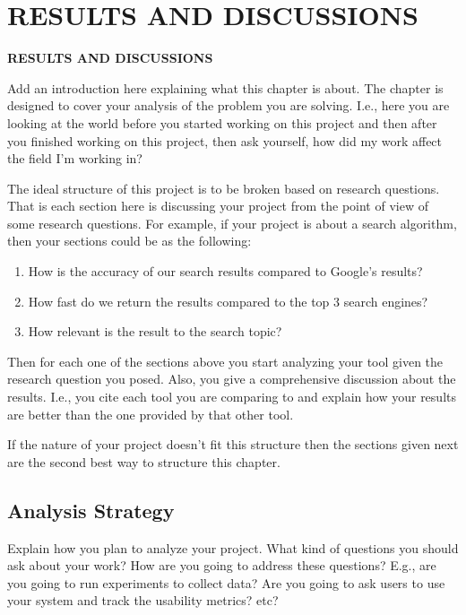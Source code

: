\chapter{RESULTS AND DISCUSSIONS}
\pagebreak


\begin{center}
{\LARGE\textbf{RESULTS AND DISCUSSIONS}}
\end{center}

Add an introduction here explaining what this chapter is about. The chapter is designed to cover your analysis of the problem you are solving. I.e., here you are looking at the world before you started working on this project and then after you finished working on this project, then ask yourself, how did my work affect the field I'm working in?

The ideal structure of this project is to be broken based on research questions. That is each section here is discussing your project from the point of view of some research questions. For example, if your project is about a search algorithm, then your sections could be as the following:

\begin{enumerate}
    \item How is the accuracy of our search results compared to Google's results?
    \item How fast do we return the results compared to the top 3 search engines?
    \item How relevant is the result to the search topic?
\end{enumerate}

Then for each one of the sections above you start analyzing your tool given the research question you posed. Also, you give a comprehensive discussion about the results. I.e., you cite each tool you are comparing to and explain how your results are better than the one provided by that other tool.

If the nature of your project doesn't fit this structure then the sections given next are the second best way to structure this chapter. 


\section{Analysis Strategy} %
\label{sec:analysis_strategy}

Explain how you plan to analyze your project. What kind of questions you should ask about your work? How are you going to address these questions? E.g., are you going to run experiments to collect data? Are you going to ask users to use your system and track the usability metrics? etc?

